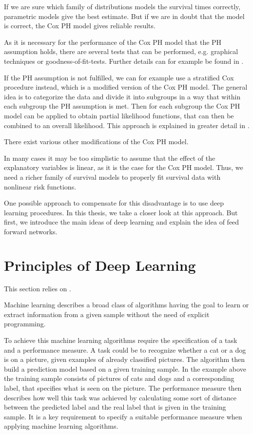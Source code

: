 \documentclass[12pt, a4paper]{article}
\theoremstyle{definition}
\theoremstyle{plain}
\numberwithin{equation}{section}
\numberwithin{figure}{section}
\numberwithin{table}{section}
\begin{document}
	If we are sure which family of distributions models the survival times correctly, parametric models give the best estimate.
	But if we are in doubt that the model is correct, the Cox PH model gives reliable results.
	
	As it is necessary for the performance of the Cox PH model that the PH assumption holds, there are several tests that can be performed, e.g. graphical techniques or goodness-of-fit-tests.
	Further details can for example be found in \citet*{sabook}.
	
	If the PH assumption is not fulfilled, we can for example use a stratified Cox procedure instead, which is a modified version of the Cox PH model.
	The general idea is to categorize the data and divide it into subgroups in a way that within each subgroup the PH assumption is met.
	Then for each subgroup the Cox PH model can be applied to obtain partial likelihood functions, that can then be combined to an overall likelihood.
	This approach is explained in greater detail in \citet*{sabook}.
	
	There exist various other modifications of the Cox PH model.
	
	In many cases it may be too simplistic to assume that the effect of the explanatory variables is linear, as it is the case for the Cox PH model.
	Thus, we need a richer family of survival models to properly fit survival data with nonlinear risk functions.
	
	One possible approach to compensate for this disadvantage is to use deep learning procedures.
	In this thesis, we take a closer look at this approach.
	But first, we introduce the main ideas of deep learning and explain the idea of feed forward networks.
	\newpage
	
	\section{Principles of Deep Learning}\label{basicsdl}
	This section relies on \citet*{deeplbook}.
	
	Machine learning describes a broad class of algorithms having the goal to learn or extract information from a given sample without the need of explicit programming.
	
	To achieve this machine learning algorithms require the specification of a task and a performance measure.
	A task could be to recognize whether a cat or a dog is on a picture, given examples of already classified pictures.
	The algorithm then build a prediction model based on a given training sample.
	In the example above the training sample consists of pictures of cats and dogs and a corresponding label, that specifies what is seen on the picture.
	The performance measure then describes how well this task was achieved by calculating some sort of distance between the predicted label and the real label that is given in the training sample.
	It is a key requirement to specify a suitable performance measure when applying machine learning algorithms.
	
\end{document}
